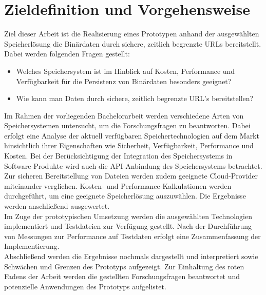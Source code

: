 \newpage

\section{Zieldefinition und Vorgehensweise}

Ziel dieser Arbeit ist die Realisierung eines Prototypen anhand der ausgewählten Speicherlösung die Binärdaten durch sichere, zeitlich begrenzte URLs bereitstellt. Dabei werden folgenden Fragen gestellt:

\begin{itemize}
	\item Welches Speichersystem ist im Hinblick auf Kosten, Performance und Verfügbarkeit für die Persistenz von Binärdaten besonders geeignet? 
	\item Wie kann man Daten durch sichere, zeitlich begrenzte URL's bereitstellen?
\end{itemize}

Im Rahmen der vorliegenden Bachelorarbeit werden verschiedene Arten von Speichersystemen untersucht, um die Forschungsfragen zu beantworten. Dabei erfolgt eine Analyse der aktuell verfügbaren Speichertechnologien auf dem Markt hinsichtlich ihrer Eigenschaften wie Sicherheit, Verfügbarkeit, Performance und Kosten. Bei der Berücksichtigung der Integration des Speichersystems in Software-Produkte wird auch die API-Anbindung des Speichersystems betrachtet. Zur sicheren Bereitstellung von Dateien werden zudem geeignete Cloud-Provider miteinander verglichen. Kosten- und Performance-Kalkulationen werden durchgeführt, um eine geeignete Speicherlösung auszuwählen. Die Ergebnisse werden anschließend ausgewertet.\\

Im Zuge der prototypischen Umsetzung werden die ausgewählten Technologien implementiert und Testdateien zur Verfügung gestellt. Nach der Durchführung von Messungen zur Performance auf Testdaten erfolgt eine Zusammenfassung der Implementierung.\\

Abschließend werden die Ergebnisse nochmals dargestellt und interpretiert sowie Schwächen und Grenzen des Prototyps aufgezeigt. Zur Einhaltung des roten Fadens der Arbeit werden die gestellten Forschungsfragen beantwortet und potenzielle Anwendungen des Prototyps aufgelistet.

